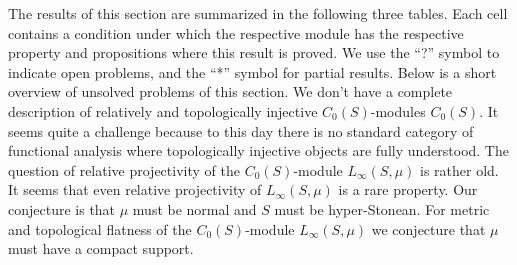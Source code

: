 The results of this section are summarized in the following three tables. Each cell
contains a condition under which the respective module has the respective
property and propositions where this result is proved. We use the ``?'' symbol to 
indicate open problems, and the ``*'' symbol for partial results. Below is a short 
overview of unsolved problems of this section. We don't have a complete 
description of relatively and topologically injective $C_0(S)$-modules $C_0(S)$. 
It seems quite a challenge because to this day there is no standard category of 
functional analysis where topologically injective objects are fully understood. 
The question of relative projectivity of the $C_0(S)$-module $L_\infty(S,\mu)$ is 
rather old. It seems that even relative projectivity of $L_\infty(S,\mu)$ is a 
rare property. Our conjecture is that $\mu$ must be normal and $S$ must be 
hyper-Stonean. For metric and topological flatness 
of the $C_0(S)$-module $L_\infty(S,\mu)$ we conjecture that $\mu$ must have a 
compact support. 

